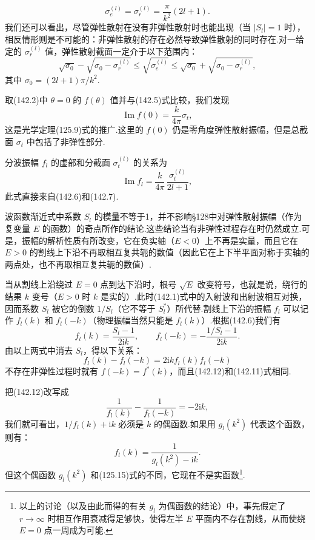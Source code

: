 \begin{equation}
  \sigma_e^{(l)}=\sigma_r^{(l)}=\frac{\pi}{k^2}(2l+1).
\end{equation}
我们还可以看出，尽管弹性散射在没有非弹性散射时也能出现（当 $|S_l|=1$ 时），相反情形则是不可能的：非弹性散射的存在必然导致弹性散射的同时存在.对一给定的 $\sigma_r^{(l)}$ 值，弹性散射截面一定介于以下范围内：
\begin{equation}
  \sqrt{\sigma_0}-\sqrt{\sigma_0-\sigma_r^{(l)}}
  \leqslant\sqrt{\sigma_e^{(l)}}
  \leqslant\sqrt{\sigma_0}+\sqrt{\sigma_0-\sigma_r^{(l)}},
\end{equation}
其中 $\sigma_0=(2l+1)\pi/k^2$.

取(142.2)中 $\theta=0$ 的 $f(\theta)$ 值并与(142.5)式比较，我们发现
\begin{equation}
  \operatorname{Im}f(0)=\frac{k}{4\pi}\sigma_t,
\end{equation}
这是光学定理(125.9)式的推广.这里的 $f(0)$ 仍是零角度弹性散射振幅，但是总截面 $\sigma_t$ 中包括了非弹性部分.

分波振幅 $f_l$ 的虚部和分截面 $\sigma_t^{(l)}$ 的关系为
\begin{equation}
  \operatorname{Im}f_l=\frac{k}{4\pi}\,\frac{\sigma_t^{(l)}}{2l+1},
\end{equation}
此式直接来自(142.6)和(142.7).

波函数渐近式中系数 $S_l$ 的模量不等于1，并不影响§128中对弹性散射振幅（作为复变量 $E$ 的函数）的奇点所作的结论.这些结论当有非弹性过程存在时仍然成立.可是，振幅的解析性质有所改变，它在负实轴（$E<0$）上不再是实量，而且它在 $E>0$ 的割线上下沿不再取相互复共轭的数值（因此它在上下半平面对称于实轴的两点处，也不再取相互复共轭的数值）.

当从割线上沿绕过 $E=0$ 点到达下沿时，根号 $\sqrt{E}$ 改变符号，也就是说，绕行的结果 $k$ 变号（$E>0$ 时 $k$ 是实的）.此时(142.1)式中的入射波和出射波相互对换，因而系数 $S_l$ 被它的倒数 $1/S_l$（它不等于 $S_l^{*}$）所代替.割线上下沿的振幅 $f_l$ 可以记作 $f_l(k)$ 和 $f_l(-k)$（物理振幅当然只能是 $f_l(k)$）.根据(142.6)我们有
\begin{equation*}
  f_l(k)=\frac{S_l-1}{2\mathrm{i}k},\qquad
  f_l(-k)=-\frac{1/S_l-1}{2\mathrm{i}k}.
\end{equation*}
由以上两式中消去 $S_l$，得以下关系：
\begin{equation}
  f_l(k)-f_l(-k)=2\mathrm{i}kf_l(k)f_l(-k)
\end{equation}
不存在非弹性过程时就有 $f(-k)=f^{*}(k)$，而且(142.12)和(142.11)式相同.

把(142.12)改写成
\begin{equation*}
  \frac{1}{f_l(k)}-\frac{1}{f_l(-k)}=-2\mathrm{i}k,
\end{equation*}
我们就可看出，$1/f_l(k)+\mathrm{i}k$ 必须是 $k$ 的偶函数.如果用 $g_l(k^2)$ 代表这个函数，则有：
\begin{equation}
  f_l(k)=\frac{1}{g_l(k^2)-\mathrm{i}k}.
\end{equation}
但这个偶函数 $g_l(k^2)$ 和(125.15)式的不同，它现在不是实函数\footnote{以上的讨论（以及由此而得的有关 $g_l$ 为偶函数的结论）中，事先假定了 $r\to\infty$ 时相互作用衰减得足够快，使得左半 $E$ 平面内不存在割线，从而使绕 $E=0$ 点一周成为可能.}.

